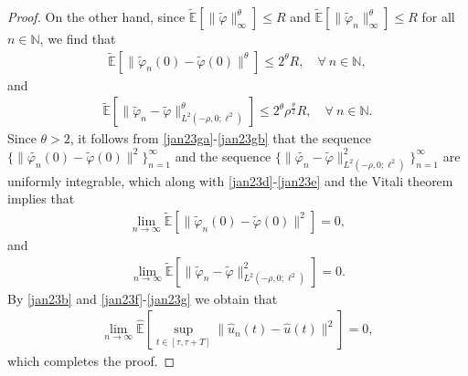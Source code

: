 \documentclass[10pt,a4paper]{amsart}
\begin{document}
\begin{proof}
On the other hand,
since  
$ \widetilde{\mathbb{E}} 
          \left[ \| {\widetilde{\varphi}} \|^\theta_\infty
          \right] 
     \le R$ and
 $ \widetilde{\mathbb{E}} 
          \left[ \| {\widetilde{\varphi}}_n\|^\theta_\infty
          \right] 
     \le R$
for all $n \in \mathbb{N}$,
we find that
\begin{align} \label{jan23ga}
 \widetilde{\mathbb{E}} 
       \left[ \|{\widetilde{\varphi}}_n(0) - \widetilde{\varphi}(0)\|^\theta \right]
  \le  2^\theta R, \quad 
               \forall \ n \in \mathbb{N},
\end{align}
and 
\begin{align} \label{jan23gb}
 \widetilde{\mathbb{E}} 
       \left[ \| {\widetilde{\varphi}}_n 
                    - \widetilde{\varphi}\|^\theta_{L^2(-\rho, 0; \ell^2)}  
       \right]
 \le 2^\theta  \rho^{\frac \theta{2}} R, \quad 
               \forall \ n\in \mathbb{N}.
\end{align}
Since  $\theta>2$, it follows from
\eqref{jan23ga}-\eqref{jan23gb}
that
the sequence 
$\{\|\widetilde{\varphi_n}(0) - \widetilde{\varphi}(0)\|^2\}_{n=1}^\infty$
and the sequence 
 $\{ \| \widetilde{\varphi_n} - \widetilde{\varphi} 
       \|^2_{L^2(-\rho, 0; \ell^2)}
   \}_{n=1}^\infty$
are uniformly integrable,
which along with \eqref{jan23d}-\eqref{jan23e}
and the  Vitali  theorem 
implies that   
\begin{align} \label{jan23f}
 \lim_{n \to \infty}
      \widetilde{\mathbb{E}} 
             \left[ \| \widetilde{\varphi}_n(0) - \widetilde{\varphi}(0) \|^2 \right]
   = 0,
\end{align}
 and 
\begin{align} \label{jan23g}
 \lim_{n \to \infty}
      \widetilde{\mathbb{E}} 
       \left[ \| {\widetilde{\varphi}}_n - \widetilde{\varphi} \|^2_{L^2(-\rho, 0; \ell^2)}     
      \right] 
  = 0.
\end{align}
 By
 \eqref{jan23b}
 and
 \eqref{jan23f}-\eqref{jan23g}  we obtain
 that  
\begin{align}\label{feb23a}
 \lim_{n\to \infty}
 \widehat{\mathbb{E}}
       \left[ \sup_{t \in [\tau, \tau +T]}
                            \| \hat{u}_n(t) - \hat{u}(t) \|^2
       \right]  
  = 0,
\end{align}
which  completes the proof.
  \end{proof}
\end{document}
